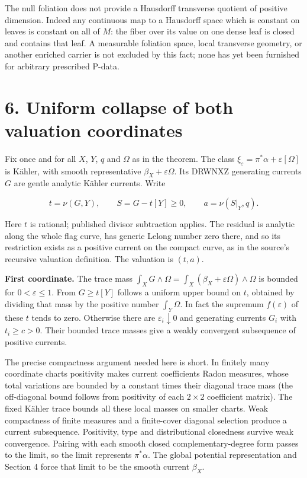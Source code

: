 \documentclass[11pt]{article}
\begin{document}
The null foliation does not provide a Hausdorff transverse quotient of positive dimension. Indeed any continuous map to a Hausdorff space which is constant on leaves is constant on all of $M$: the fiber over its value on one dense leaf is closed and contains that leaf. A measurable foliation space, local transverse geometry, or another enriched carrier is not excluded by this fact; none has yet been furnished for arbitrary prescribed P-\allowbreak{}data.

\section*{6. Uniform collapse of both valuation coordinates}

Fix once and for all $X$, $Y$, $q$ and $\Omega$ as in the theorem. The class $\xi_\varepsilon=\pi^*\alpha+\varepsilon[\Omega]$ is Kähler, with smooth representative $\beta_X+\varepsilon\Omega$. Its DRWNXZ generating currents $G$ are gentle analytic Kähler currents. Write

\[t=\nu(G,Y),\qquad S=G-t[Y]\geq0,\qquad a=\nu(S|_Y,q).\]

Here $t$ is rational; published divisor subtraction applies. The residual is analytic along the whole flag curve, has generic Lelong number zero there, and so its restriction exists as a positive current on the compact curve, as in the source's recursive valuation definition. The valuation is $(t,a)$.

\textbf{First coordinate.} The trace mass $\int_XG\wedge\Omega=\int_X(\beta_X+\varepsilon\Omega)\wedge\Omega$ is bounded for $0<\varepsilon\leq1$. From $G\geq t[Y]$ follows a uniform upper bound on $t$, obtained by dividing that mass by the positive number $\int_Y\Omega$. In fact the supremum $f(\varepsilon)$ of these $t$ tends to zero. Otherwise there are $\varepsilon_i\downarrow0$ and generating currents $G_i$ with $t_i\geq c>0$. Their bounded trace masses give a weakly convergent subsequence of positive currents.

The precise compactness argument needed here is short. In finitely many coordinate charts positivity makes current coefficients Radon measures, whose total variations are bounded by a constant times their diagonal trace mass (the off-\allowbreak{}diagonal bound follows from positivity of each $2\times2$ coefficient matrix). The fixed Kähler trace bounds all these local masses on smaller charts. Weak compactness of finite measures and a finite-\allowbreak{}cover diagonal selection produce a current subsequence. Positivity, type and distributional closedness survive weak convergence. Pairing with each smooth closed complementary-\allowbreak{}degree form passes to the limit, so the limit represents $\pi^*\alpha$. The global potential representation and Section 4 force that limit to be the smooth current $\beta_X$.
\end{document}
